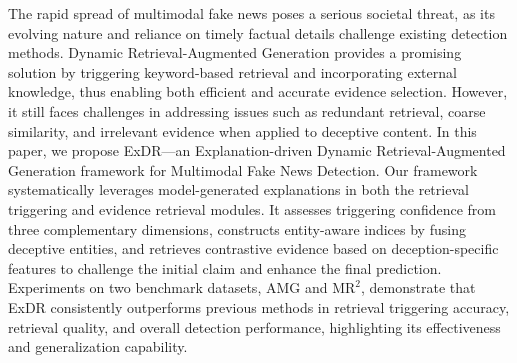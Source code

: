 The rapid spread of multimodal fake news poses a serious societal threat, as its evolving nature and reliance on timely factual details challenge existing detection methods. 
Dynamic Retrieval-Augmented Generation provides a promising solution by triggering keyword-based retrieval and incorporating external knowledge, thus enabling both efficient and accurate evidence selection. However, it still faces challenges in addressing issues such as redundant retrieval, coarse similarity, and irrelevant evidence when applied to deceptive content.
In this paper, we propose ExDR—an Explanation-driven Dynamic Retrieval-Augmented Generation framework for Multimodal Fake News Detection. Our framework systematically leverages model-generated explanations in both the retrieval triggering and evidence retrieval modules. It assesses triggering confidence from three complementary dimensions, constructs entity-aware indices by fusing deceptive entities, and retrieves contrastive evidence based on deception-specific features to challenge the initial claim and enhance the final prediction.
Experiments on two benchmark datasets, AMG and $\text{MR}^2$, demonstrate that ExDR consistently outperforms previous methods in retrieval triggering accuracy, retrieval quality, and overall detection performance, highlighting its effectiveness and generalization capability.